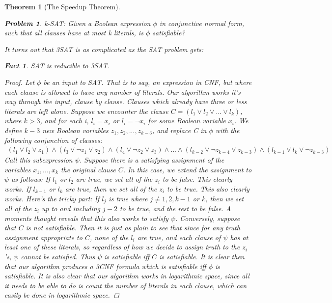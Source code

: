 \documentclass{article}
\theoremstyle{definition}
\newtheorem{problem}{Problem}
\theoremstyle{plain}
\theoremstyle{theorem}
\newtheorem{fact}{Fact}[section]
\newtheorem{theorem}{Theorem}[section]
\begin{document}
\begin{theorem}[The Speedup Theorem]
\begin{problem}
k-SAT: Given a Boolean expression $\phi$ in conjunctive normal form, such that all clauses have at most k literals, is $\phi$ satisfiable?
\end{problem}
It turns out that 3SAT is as complicated as the SAT problem gets:
\begin{fact}
    SAT is reducible to 3SAT. 
\end{fact}
\begin{proof}
    Let $\phi$ be an input to SAT. That is to say, an expression in CNF, but where each clause is allowed to have any number of literals. Our algorithm works it's way through the input, clause by clause. Clauses which already have three or less literals are left alone. Suppose we encounter the clause $C=(l_1 \vee l_2 \vee ... \vee l_k)$, where $k>3$, and for each i, $l_i = x_i$ or $l_i = \neg x_i$ for some Boolean variable $x_i$. We define $k-3$ new Boolean variables $z_1, z_2,...,z_{k-3}$, and replace C in $\phi$ with the following conjunction of clauses:
    \begin{align}
        (l_1 \vee l_2 \vee z_1) \wedge (l_3 \vee \neg z_1 \vee z_2) \wedge (l_4 \vee \neg z_2 \vee z_3) \wedge ... \wedge (l_{k-2} \vee \neg z_{k-4} \vee z_{k-3}) \wedge (l_{k-1} \vee l_k \vee \neg z_{k-3})
    \end{align}
    Call this subexpression $\psi$. Suppose there is a satisfying assignment of the variables $x_1,...,x_k$ the original clause $C$. In this case, we extend the assignment to $\psi$ as follows: If $l_1$ or $l_2$ are true, we set \textit{all} of the $z_i$ to be false. This clearly works. If $l_{k-1}$ or $l_k$ are true, then we set \textit{all} of the $z_i$ to be true. This also clearly works. Here's the tricky part: If $l_j$ is true where $j \neq 1,2,k-1$ or $k$, then we set all of the $z_i$ up to and including $j-2$ to be true, and the rest to be false. A moments thought reveals that this also works to satisfy $\psi$. Conversely, suppose that $C$ is not satisfiable. Then it is just as plain to see that since for any truth assignment appropriate to $C$, none of the $l_i$ are true, and each clause of $\psi$ has at least one of these literals, so regardless of how we decide to assign truth to the $z_i$'s, $\psi$ cannot be satisfied. Thus $\psi$ is satisfiable iff $C$ is satisfiable. It is clear then that our algorithm produces a 3CNF formula which is satisfiable iff $\phi$ is satisfiable. It is also clear that our algorithm works in logarithmic space, since all it needs to be able to do is count the number of literals in each clause, which can easily be done in logarithmic space. 

\end{proof}
\end{theorem}
\end{document}
